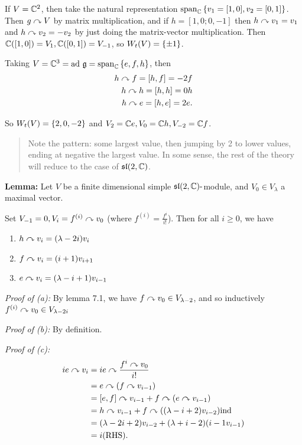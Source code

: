 If \(V = {\mathbb{C}}^2\), then take the natural representation
\(\mathrm{span}_{\mathbb{C}}\left\{{v_1 = [1, 0], v_2 = [0, 1]}\right\}\). Then
\(g\curvearrowright V\) by matrix multiplication, and if \(h = [1, 0; 0, -1]\)
then \(h\curvearrowright v_1 = v_1\) and \(h\curvearrowright v_2 = -v_2\) by just doing
the matrix-vector multiplication. Then
\({\mathbb{C}}([1, 0]) = V_1, {\mathbb{C}}([0, 1]) = V_{-1}\), so
\(W_t(V) = \left\{{\pm 1}\right\}\).

Taking \(V = {\mathbb{C}}^3 = \mathrm{ad}~ {\mathfrak{g}} = \mathrm{span}_{\mathbb{C}} \left\{{e, f, h}\right\}\),
then \begin{align*}
h\curvearrowright f = [h, f] = -2f \\
h\curvearrowright h = [h, h] = 0h \\
h\curvearrowright e = [h, e] = 2e
.\end{align*}

So \(W_t(V) = \left\{{2, 0, -2}\right\}\) and
\(V_2 = {\mathbb{C}} e, V_0 = {\mathbb{C}} h, V_{-2} = {\mathbb{C}} f\).

\begin{quote}
Note the pattern: some largest value, then jumping by 2 to lower values,
ending at negative the largest value. In some sense, the rest of the
theory will reduce to the case of \({\mathfrak{sl}}(2, {\mathbb{C}})\).
\end{quote}

\textbf{Lemma:} Let \(V\) be a finite dimensional simple
\({\mathfrak{sl}}(2, {\mathbb{C}}){\hbox{-}}\)module, and \(V_0 \in V_\lambda\) a maximal
vector.

Set \(V_{-1} = 0, V_i = f^{(i)} \curvearrowright v_0\) (where
\(f^{(i)} = \frac{f^i}{i!}\)). Then for all \(i \geq 0\), we have

\begin{enumerate}
\def\labelenumi{\alph{enumi}.}
\tightlist
\item
  \(h\curvearrowright v_i = (\lambda - 2i) v_i\)
\item
  \(f\curvearrowright v_i = (i+1)v_{i+1}\)
\item
  \(e\curvearrowright v_i = (\lambda - i + 1)v_{i-1}\)
\end{enumerate}

\emph{Proof of (a):} By lemma 7.1, we have
\(f\curvearrowright v_0 \in V_{\lambda - 2}\), and so inductively
\(f^{(i)}\curvearrowright v_0 \in V_{\lambda - 2i}\)

\emph{Proof of (b):} By definition.

\emph{Proof of (c):} \begin{align*}
ie\curvearrowright v_i 
&= ie \curvearrowright \frac{f^i \curvearrowright v_0}{ i! }\\
&= e\curvearrowright (f\curvearrowright v_{i-1}) \\
&= [e,f] \curvearrowright v_{i-1} + f\curvearrowright (e\curvearrowright v_{i-1}) \\
&= h \curvearrowright v_{i-1} + f\curvearrowright((\lambda -i + 2)v_{i-2}) \text{ind} \\
&= (\lambda - 2i + 2) v_{i-2} + (\lambda + i - 2)(i-1 v_{i-1}) \\
&= i (\text{RHS})
.\end{align*}

